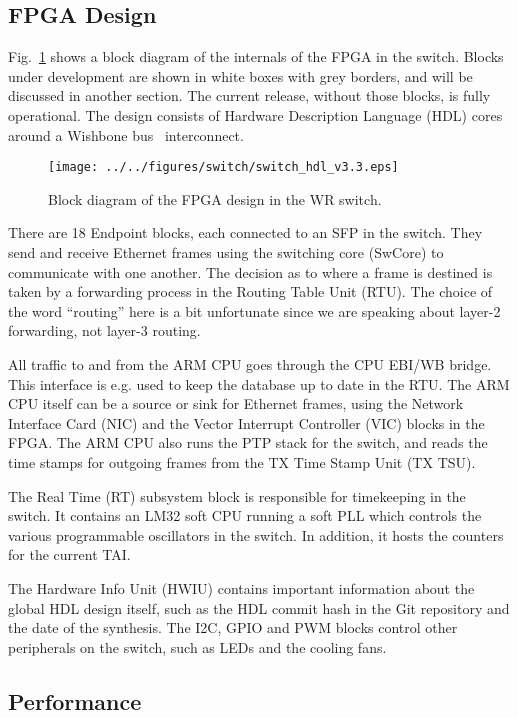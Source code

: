 \documentclass{../JAC2003}
\begin{document}
\subsection{FPGA Design} 

Fig.~\ref{switch-fpga-fig} shows a block diagram of the internals of
the FPGA in the switch. Blocks under development are shown in white
boxes with grey borders, and will be discussed in another section. The
current release, without those blocks, is fully operational. The
design consists of Hardware Description Language (HDL) cores around a
Wishbone bus~\cite{wishbone-ref} interconnect.

\begin{figure}[htb]
   \centering
   \texttt{[image: ../../figures/switch/switch\_hdl\_v3.3.eps]}
   \caption{Block diagram of the FPGA design in the WR switch.}
   \label{switch-fpga-fig}
\end{figure}

There are 18 Endpoint blocks, each connected to an SFP in the
switch. They send and receive Ethernet frames using the switching core
(SwCore) to communicate with one another. The decision as to where a
frame is destined is taken by a forwarding process in the Routing
Table Unit (RTU). The choice of the word ``routing'' here is a bit
unfortunate since we are speaking about layer-2 forwarding, not
layer-3 routing. 

All traffic to and from the ARM CPU goes through the CPU EBI/WB
bridge. This interface is e.g. used to keep the database up to date in
the RTU. The ARM CPU itself can be a source or sink for Ethernet
frames, using the Network Interface Card (NIC) and the Vector
Interrupt Controller (VIC) blocks in the FPGA. The ARM CPU also runs
the PTP stack for the switch, and reads the time stamps for outgoing
frames from the TX Time Stamp Unit (TX TSU).

The Real Time (RT) subsystem block is responsible for timekeeping in
the switch. It contains an LM32 soft CPU running a soft PLL which
controls the various programmable oscillators in the switch. In
addition, it hosts the counters for the current TAI.

The Hardware Info Unit (HWIU) contains important information about the
global HDL design itself, such as the HDL commit hash in the Git
repository and the date of the synthesis. The I2C, GPIO and PWM blocks
control other peripherals on the switch, such as LEDs and the cooling
fans. 

\subsection{Performance}
\end{document}
